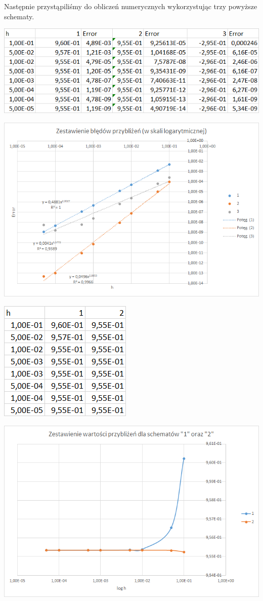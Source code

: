 Następnie przystąpiliśmy do obliczeń numerycznych wykorzystując trzy powyższe schematy.

\newpage

\includegraphics{Lab2/charts/wsp_log_dane.png}

\includegraphics{Lab2/charts/wsp_log.png}
\newpage

\includegraphics{Lab2/charts/wsp_log_e_dane.png}

\includegraphics{Lab2/charts/wsp_log_e.png}
\newpage

